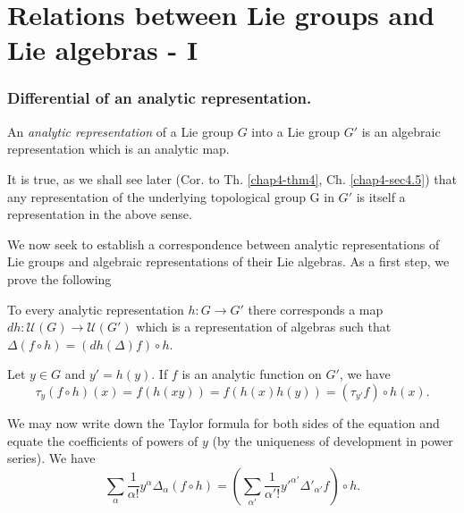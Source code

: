 
\chapter{Relations between Lie groups and Lie algebras - I}\label{chap3} 

\setcounter{section}{3}
\setcounter{subsection}{0}
\subsection{Differential of an analytic
  representation.}\label{chap3-sec3.1}\pageoriginale 

\begin{defi*}
An {\em analytic representation} of a Lie group $G$ into a Lie group $G'$
is an algebraic representation which is an analytic map. 
\end{defi*}

\begin{remark*}
It is true, as we shall see later (Cor. to Th. \ref{chap4-thm4},
Ch. \ref{chap4-sec4.5}) that any 
representation of the underlying topological group G in $G'$ is
itself a representation in the above sense. 
\end{remark*}

We now seek to establish a correspondence between analytic
representations of Lie groups and algebraic representations of their
Lie algebras. As a first step, we prove the following 

\setcounter{proposition}{0}
\begin{proposition}\label{chap3-prop1}%
To every analytic representation $h : G \longrightarrow G'$ there
corresponds a map $dh : \mathcal{U}(G)\rightarrow
\mathcal{U}(G')$ which is a representation of algebras such that
$\Delta(f\circ  h)=(dh (\Delta)f)\circ h$. 
\end{proposition}

Let $y \in G$ and $y'=h(y)$. If $f$ is an analytic function on $G'$,
we have 
$$
\tau_y(f\circ  h)(x)=f(h(xy))=f(h(x) h(y))=(\tau_{y'}f)\circ  h (x). 
$$

We may now write down the Taylor formula for both sides of the
equation and equate the coefficients of powers of $y$ (by the
uniqueness of development in power series). We have 
$$
\sum_{\alpha}\dfrac{1}{\alpha !}y^\alpha \Delta_\alpha(f \circ
h)= ( \sum\limits_{\alpha'} \dfrac{1}{\alpha'!} y'^{\alpha'}
\Delta'_{\alpha'} f)\circ h. 
$$

